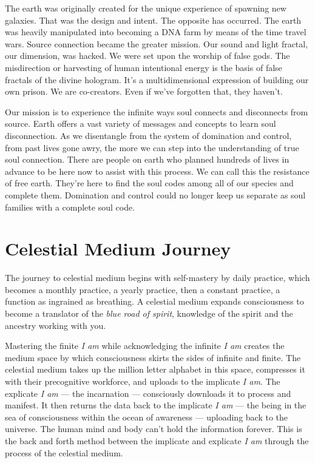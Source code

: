 \documentclass[letterpaper,9pt,twoside,titlepage,onecolumn,openany]{book}
\begin{document}
The earth was originally created for the unique experience of spawning
new galaxies. That was the design and intent. The opposite has occurred.
The earth was heavily manipulated into becoming a DNA farm by means of
the time travel wars. Source connection became the greater mission. Our
sound and light fractal, our dimension, was hacked. We were set upon the
worship of false gods. The misdirection or harvesting of human
intentional energy is the basis of false fractals of the divine
hologram. It's a multidimensional expression of building our own prison.
We are co-creators. Even if we've forgotten that, they haven't.

Our mission is to experience the infinite ways soul connects and
disconnects from source. Earth offers a vast variety of messages and
concepts to learn soul disconnection. As we disentangle from the system
of domination and control, from past lives gone awry, the more we can
step into the understanding of true soul connection. There are people on
earth who planned hundreds of lives in advance to be here now to assist
with this process. We can call this the resistance of free earth.
They're here to find the soul codes among all of our species and
complete them. Domination and control could no longer keep us separate
as soul families with a complete soul code.

\section*{Celestial Medium Journey}\label{celestial-medium-journey}

The journey to celestial medium begins with self-mastery by daily
practice, which becomes a monthly practice, a yearly practice, then a
constant practice, a function as ingrained as breathing. A celestial
medium expands consciousness to become a translator of the \emph{blue
road of spirit}, knowledge of the spirit and the ancestry working with
you.

Mastering the finite \emph{I am} while acknowledging the infinite
\emph{I am} creates the medium space by which consciousness skirts the
sides of infinite and finite. The celestial medium takes up the million
letter alphabet in this space, compresses it with their precognitive
workforce, and uploads to the implicate \emph{I am}. The explicate
\emph{I am} --- the incarnation --- consciously downloads it to process
and manifest. It then returns the data back to the implicate \emph{I am}
--- the being in the sea of consciousness within the ocean of awareness
--- uploading back to the universe. The human mind and body can't hold
the information forever. This is the back and forth method between the
implicate and explicate \emph{I am} through the process of the celestial
medium.
\end{document}
